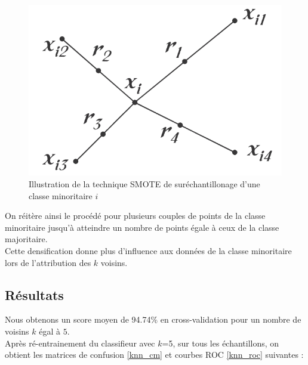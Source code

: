 \documentclass{book}
\begin{document}
\begin{figure}[H]
 \begin{center}
 \includegraphics[scale=0.3]{../5_diaporama/images/oversampling/smote.png}
 \caption{Illustration de la technique SMOTE de suréchantillonage d'une classe minoritaire $i$}
 \label{smote}
 \end{center}
\end{figure}

On réitère ainsi le procédé pour plusieurs couples de points de la classe minoritaire jusqu'à atteindre un nombre de points
égale à ceux de la classe majoritaire.\\
Cette densification donne plus d'influence aux données de la classe minoritaire lors de l'attribution des $k$ voisins.\\

\subsection{Résultats}

Nous obtenons un score moyen de 94.74\% en cross-validation pour un nombre de voisins $k$ égal à $5$. \\
Après ré-entrainement du classifieur avec $k$=5, sur tous les échantillons, on obtient les matrices de confusion \ref{knn_cm} et courbes ROC \ref{knn_roc} suivantes :
\end{document}
